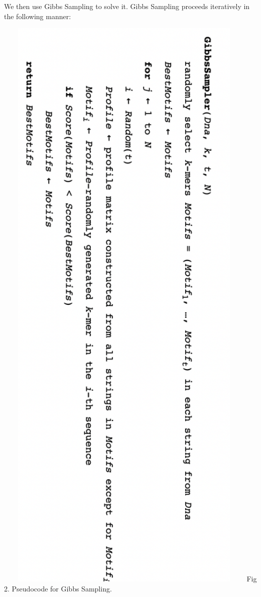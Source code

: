 \documentclass[12pt]{scrartcl} %
\begin{document}
We then use Gibbs Sampling to solve it. Gibbs Sampling proceeds iteratively in the following manner:
\begin{center}
    \includegraphics[width=0.95\textwidth]{Pictures/Pseudocode.png}
    \newline Fig 2. Pseudocode for Gibbs Sampling.
\end{center}
\end{document}
